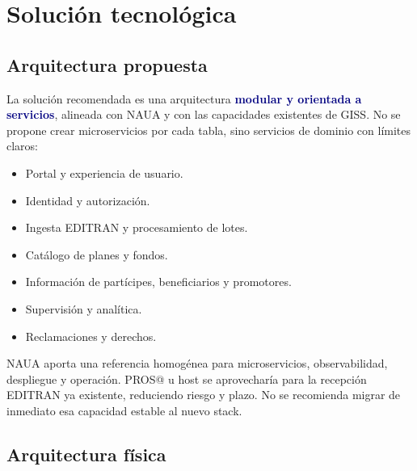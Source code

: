 \documentclass[11pt,a4paper]{article}
\newcommand{\key}[1]{\textbf{\textcolor{navy}{#1}}}
\begin{document}
\section{Solución tecnológica}

\subsection{Arquitectura propuesta}

La solución recomendada es una arquitectura \key{modular y orientada a servicios}, alineada con NAUA y con las capacidades existentes de GISS. No se propone crear microservicios por cada tabla, sino servicios de dominio con límites claros:
\begin{itemize}
\item Portal y experiencia de usuario.
\item Identidad y autorización.
\item Ingesta EDITRAN y procesamiento de lotes.
\item Catálogo de planes y fondos.
\item Información de partícipes, beneficiarios y promotores.
\item Supervisión y analítica.
\item Reclamaciones y derechos.
\end{itemize}

NAUA aporta una referencia homogénea para microservicios, observabilidad, despliegue y operación. PROS@ u host se aprovecharía para la recepción EDITRAN ya existente, reduciendo riesgo y plazo. No se recomienda migrar de inmediato esa capacidad estable al nuevo stack.

\subsection{Arquitectura física}
\begin{center}
\end{center}
\end{document}
